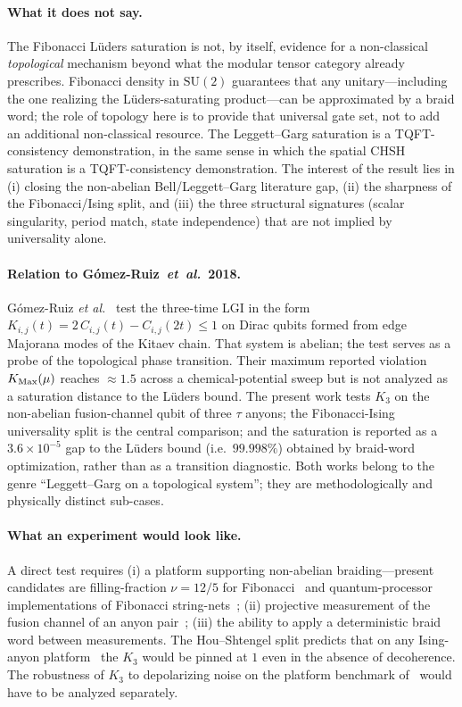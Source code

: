 \documentclass[aps,prx,reprint,amsmath,amssymb,floatfix,nofootinbib,superscriptaddress]{revtex4-2}
\begin{document}
\paragraph{What it does not say.}
The Fibonacci L\"uders saturation is not, by itself, evidence for a
non-classical \emph{topological} mechanism beyond what the modular
tensor category already prescribes. Fibonacci density in
$\mathrm{SU}(2)$ guarantees that any unitary---including the one
realizing the L\"uders-saturating product---can be approximated by a
braid word; the role of topology here is to provide that universal
gate set, not to add an additional non-classical resource. The
Leggett--Garg saturation is a TQFT-consistency demonstration, in the
same sense in which the spatial CHSH saturation is a TQFT-consistency
demonstration. The interest of the result lies in (i) closing the
non-abelian Bell/Leggett--Garg literature gap, (ii) the sharpness of
the Fibonacci/Ising split, and (iii) the three structural signatures
(scalar singularity, period match, state independence) that are not
implied by universality alone.

\paragraph{Relation to G\'omez-Ruiz~\textit{et~al.}~2018.}
G\'omez-Ruiz \emph{et al.}~\cite{GomezRuiz2018} test the three-time
LGI in the form $K_{i,j}(t) = 2\,C_{i,j}(t) - C_{i,j}(2t) \leq 1$ on
Dirac qubits formed from edge Majorana modes of the Kitaev chain.
That system is abelian; the test serves as a probe of the topological
phase transition. Their maximum reported violation $K_{\rm Max}(\mu)$
reaches $\approx 1.5$ across a chemical-potential sweep but is not
analyzed as a saturation distance to the L\"uders bound. The present
work tests $K_{3}$ on the non-abelian fusion-channel qubit of three
$\tau$ anyons; the Fibonacci-Ising universality split is the central
comparison; and the saturation is reported as a $3.6 \times 10^{-5}$
gap to the L\"uders bound (i.e.\ $99.998\%$) obtained by braid-word
optimization, rather than as a transition diagnostic. Both works
belong to the genre ``Leggett--Garg on a topological system''; they
are methodologically and physically distinct sub-cases.

\paragraph{What an experiment would look like.}
A direct test requires (i) a platform supporting non-abelian
braiding---present candidates are filling-fraction $\nu = 12/5$ for
Fibonacci~\cite{NayakSimonStern2008} and quantum-processor
implementations of Fibonacci string-nets~\cite{Xu2024,Minev2025};
(ii) projective measurement of the fusion channel of an anyon
pair~\cite{Bonderson2008}; (iii) the ability to apply a deterministic
braid word between measurements. The Hou--Shtengel split predicts
that on any Ising-anyon platform~\cite{Andersen2023,Iqbal2024} the
$K_{3}$ would be pinned at $1$ even in the absence of decoherence.
The robustness of $K_{3}$ to depolarizing noise on the platform
benchmark of~\cite{Andersen2023} would have to be analyzed
separately.
\end{document}
